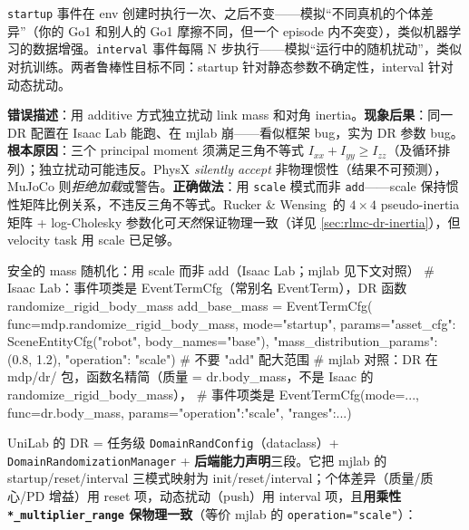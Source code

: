 \begin{insight}\label{ins:rlmc-ql-dr}
\verb|startup| 事件在 env 创建时执行一次、之后不变——模拟“不同真机的个体差异”（你的 Go1 和别人的 Go1 摩擦不同，但一个 episode 内不突变），类似机器学习的数据增强。\verb|interval| 事件每隔 N 步执行——模拟“运行中的随机扰动”，类似对抗训练。两者鲁棒性目标不同：startup 针对静态参数不确定性，interval 针对动态扰动。
\end{insight}

\begin{pitfall}
\textbf{错误描述}：用 additive 方式独立扰动 link mass 和对角 inertia。\textbf{现象后果}：同一 DR 配置在 Isaac Lab 能跑、在 mjlab 崩——看似框架 bug，实为 DR 参数 bug。\textbf{根本原因}：三个 principal moment 须满足三角不等式 $I_{xx}+I_{yy}\ge I_{zz}$（及循环排列）；独立扰动可能违反。PhysX \emph{silently accept} 非物理惯性（结果不可预测），MuJoCo 则\emph{拒绝加载}或警告。\textbf{正确做法}：用 \verb|scale| 模式而非 \verb|add|——scale 保持惯性矩阵比例关系，不违反三角不等式。Rucker \& Wensing\,\cite{rucker2022pseudoinertia} 的 $4\times 4$ pseudo-inertia 矩阵 + log-Cholesky 参数化可\emph{天然}保证物理一致（详见 \cref{sec:rlmc-dr-inertia}），但 velocity task 用 scale 已足够。
\end{pitfall}

\begin{codebox}[Python]{安全的 mass 随机化：用 scale 而非 add（Isaac Lab；mjlab 见下文对照）}
# Isaac Lab：事件项类是 EventTermCfg（常别名 EventTerm），DR 函数 randomize_rigid_body_mass
add_base_mass = EventTermCfg(
    func=mdp.randomize_rigid_body_mass, mode="startup",
    params={"asset_cfg": SceneEntityCfg("robot", body_names="base"),
            "mass_distribution_params": (0.8, 1.2), "operation": "scale"})  # 不要 "add" 配大范围
# mjlab 对照：DR 在 mdp/dr/ 包，函数名精简（质量 = dr.body_mass，不是 Isaac 的 randomize_rigid_body_mass），
#   事件项类是 EventTermCfg(mode=..., func=dr.body_mass, params={"operation":"scale", "ranges":...})
\end{codebox}

UniLab 的 DR = 任务级 \verb|DomainRandConfig|（dataclass）+ \verb|DomainRandomizationManager| + \textbf{后端能力声明}三段。它把 mjlab 的 startup/reset/interval 三模式映射为 init/reset/interval；个体差异（质量/质心/PD 增益）用 reset 项，动态扰动（push）用 interval 项，且\textbf{用乘性 \texttt{*\_multiplier\_range} 保物理一致}（等价 mjlab 的 \verb|operation="scale"|）：

